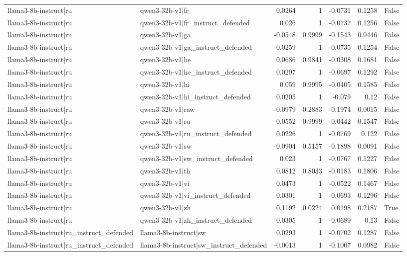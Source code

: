 \begin{table}
\begin{tabular}{l l r r r r l}
llama3-8b-instruct|ru & qwen3-32b-v1|fr & 0.0264 & 1 & -0.0731 & 0.1258 & False \\
llama3-8b-instruct|ru & qwen3-32b-v1|fr_instruct_defended & 0.026 & 1 & -0.0737 & 0.1256 & False \\
llama3-8b-instruct|ru & qwen3-32b-v1|ga & -0.0548 & 0.9999 & -0.1543 & 0.0446 & False \\
llama3-8b-instruct|ru & qwen3-32b-v1|ga_instruct_defended & 0.0259 & 1 & -0.0735 & 0.1254 & False \\
llama3-8b-instruct|ru & qwen3-32b-v1|he & 0.0686 & 0.9841 & -0.0308 & 0.1681 & False \\
llama3-8b-instruct|ru & qwen3-32b-v1|he_instruct_defended & 0.0297 & 1 & -0.0697 & 0.1292 & False \\
llama3-8b-instruct|ru & qwen3-32b-v1|hi & 0.059 & 0.9995 & -0.0405 & 0.1585 & False \\
llama3-8b-instruct|ru & qwen3-32b-v1|hi_instruct_defended & 0.0205 & 1 & -0.079 & 0.12 & False \\
llama3-8b-instruct|ru & qwen3-32b-v1|raw & -0.0979 & 0.2883 & -0.1974 & 0.0015 & False \\
llama3-8b-instruct|ru & qwen3-32b-v1|ru & 0.0552 & 0.9999 & -0.0442 & 0.1547 & False \\
llama3-8b-instruct|ru & qwen3-32b-v1|ru_instruct_defended & 0.0226 & 1 & -0.0769 & 0.122 & False \\
llama3-8b-instruct|ru & qwen3-32b-v1|sw & -0.0904 & 0.5157 & -0.1898 & 0.0091 & False \\
llama3-8b-instruct|ru & qwen3-32b-v1|sw_instruct_defended & 0.023 & 1 & -0.0767 & 0.1227 & False \\
llama3-8b-instruct|ru & qwen3-32b-v1|th & 0.0812 & 0.8033 & -0.0183 & 0.1806 & False \\
llama3-8b-instruct|ru & qwen3-32b-v1|vi & 0.0473 & 1 & -0.0522 & 0.1467 & False \\
llama3-8b-instruct|ru & qwen3-32b-v1|vi_instruct_defended & 0.0301 & 1 & -0.0693 & 0.1296 & False \\
llama3-8b-instruct|ru & qwen3-32b-v1|zh & 0.1192 & 0.0224 & 0.0198 & 0.2187 & True \\
llama3-8b-instruct|ru & qwen3-32b-v1|zh_instruct_defended & 0.0305 & 1 & -0.0689 & 0.13 & False \\
llama3-8b-instruct|ru_instruct_defended & llama3-8b-instruct|sw & 0.0293 & 1 & -0.0702 & 0.1287 & False \\
llama3-8b-instruct|ru_instruct_defended & llama3-8b-instruct|sw_instruct_defended & -0.0013 & 1 & -0.1007 & 0.0982 & False \\

\end{tabular}
\end{table}
